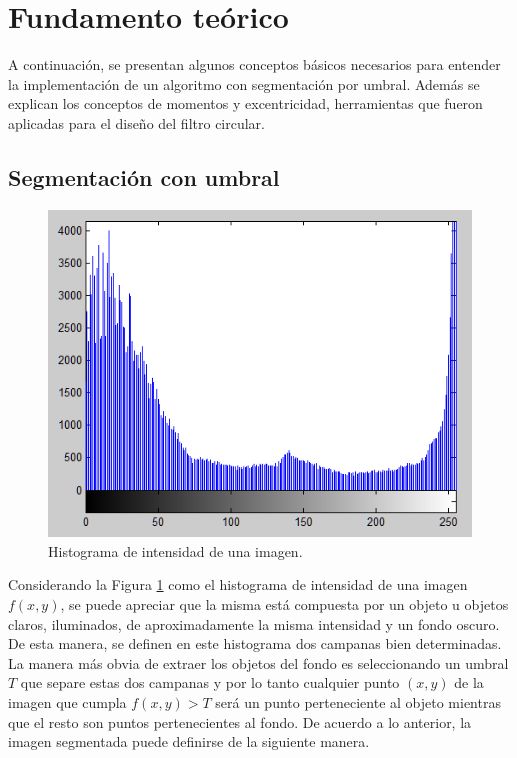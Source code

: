 \section{Fundamento teórico}
\label{fundamentoteoseg}

A continuación, se presentan algunos conceptos básicos necesarios para entender la implementación de un algoritmo con segmentación por umbral. Además se explican los conceptos de momentos y excentricidad, herramientas que fueron aplicadas para el diseño del filtro circular.

\subsection{Segmentación con umbral}

\begin{figure}[ht!]
\begin{center}
\includegraphics[scale=0.7]{img/otsu2.png}
\end{center}
\vspace{-0.5cm}
\caption{Histograma de intensidad de una imagen.} 
\label{otsuFruta}
\end{figure}


Considerando la Figura \ref{otsuFruta} como el histograma de intensidad de una imagen $f(x,y)$, se puede apreciar que la misma está compuesta por un objeto u objetos claros, iluminados, de aproximadamente la misma intensidad y un fondo oscuro. De esta manera, se definen en este histograma dos campanas bien determinadas. La manera más obvia de extraer los objetos del fondo es seleccionando un umbral $T$ que separe estas dos campanas y por lo tanto cualquier punto $(x,y)$ de la imagen que cumpla $f(x,y) > T$ será un punto perteneciente al objeto mientras que el resto son puntos pertenecientes al fondo. De acuerdo a lo anterior, la imagen segmentada puede definirse de la siguiente manera.

